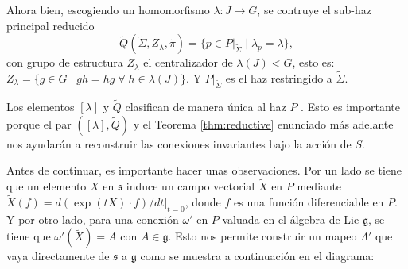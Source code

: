 Ahora bien, escogiendo un homomorfismo $\lambda: J \longrightarrow G$, se contruye el sub-haz principal reducido
%
\begin{equation}
\label{eq:ReduceBundleQ}
\tilde{Q}(\tilde{\Sigma}, Z_{\lambda}, \tilde{\pi}) = \{p \in P \vert_{\tilde{\Sigma}} \; \vert \; \lambda_{p} = \lambda\},
\end{equation}
%
con grupo de estructura $Z_{\lambda}$ el centralizador de $\lambda(J) < G$, esto es: $Z_{\lambda} = \{g \in G \; \vert \; gh = hg \; \forall \; h \in \lambda(J)\}.$ Y $P \vert_{\tilde{\Sigma}}$ es el haz restringido a $\tilde{\Sigma}$.

Los elementos $[\lambda]$ y $\tilde{Q}$ clasifican de manera \'{u}nica al haz $P$ \cite{Brodbeck}. Esto es importante porque el par $([\lambda], \tilde{Q})$ y el Teorema \autoref{thm:reductive} enunciado m\'{a}s adelante nos ayudar\'{a}n a reconstruir las conexiones invariantes bajo la acci\'{o}n de $S$.

Antes de continuar, es importante hacer unas observaciones. Por un lado se tiene que un elemento $X$ en $\mathfrak{s}$ induce un campo vectorial $\tilde{X}$ en $P$ mediante $\tilde{X}(f) = d(\exp(t X) \cdot f)/dt \vert_{t=0}$, donde $f$ es una funci\'{o}n diferenciable en $P$. Y por otro lado, para una conexi\'{o}n $\omega'$ en $P$ valuada en el \'{a}lgebra de Lie $\mathfrak{g}$, se tiene que $\omega'(\tilde{X}) = A$ con $A \in \mathfrak{g}$. Esto nos permite construir un mapeo $\Lambda'$ que vaya directamente de $\mathfrak{s}$ a $\mathfrak{g}$ como se muestra a continuaci\'{o}n en el diagrama:
%
\begin{center}
\end{center}

